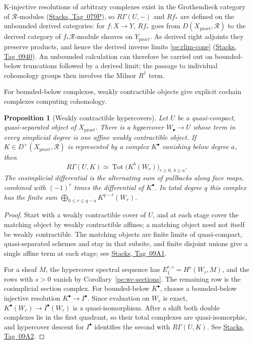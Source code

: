 \documentclass[11pt,a4paper]{article}
\numberwithin{equation}{section}
\newtheorem{proposition}[theorem]{Proposition}
\theoremstyle{definition}
\theoremstyle{remark}
\newcommand{\proet}{\mathrm{pro}\acute{e}t}
\newcommand{\stacks}[1]{\href{https://stacks.math.columbia.edu/tag/#1}{\textnormal{Stacks, Tag~#1}}}
\begin{document}
K-injective resolutions of arbitrary complexes exist in the
Grothendieck category of $\mathcal R$-modules (\stacks{079P}), so
$R\Gamma(U,-)$ and $Rf_*$ are defined on the unbounded derived
categories: for $f\colon X\to Y$, $Rf_*$ goes from
$D(X_{\proet},\mathcal R)$ to the derived category of
$f_*\mathcal R$-module sheaves on $Y_{\proet}$. As derived right adjoints they preserve products, and
hence the derived inverse limits \eqref{pe:rlim-cone} (\stacks{0940}).
An unbounded calculation can therefore be carried out on bounded-below
truncations followed by a derived limit; the passage to individual
cohomology groups then involves the Milnor $R^1$ term.

For bounded-below complexes, weakly contractible objects give explicit
cochain complexes computing cohomology.

\begin{proposition}[Weakly contractible hypercovers]
\label{pe:hypercover}
Let $U$ be a quasi-compact, quasi-separated object of $X_{\proet}$.
There is a hypercover $W_\bullet\to U$ whose term in every simplicial
degree is one affine weakly contractible object. If
$K\in D^+(X_{\proet},\mathcal R)$ is represented by a complex
$K^\bullet$ vanishing below degree $a$, then
\begin{equation}\label{pe:hypercover-complex}
 R\Gamma(U,K)
 \simeq \operatorname{Tot}\bigl(K^b(W_r)\bigr)_{r\geq0,\ b\geq a}.
\end{equation}
The cosimplicial differential is the alternating sum of pullbacks
along face maps, combined with $(-1)^r$ times the differential of
$K^\bullet$. In total degree $q$ this complex has the finite sum
$\bigoplus_{0\leq r\leq q-a}K^{q-r}(W_r)$.
\end{proposition}
\begin{proof}
Start with a weakly contractible cover of $U$, and at each stage cover
the matching object by weakly contractible affines; a matching object
need not itself be weakly contractible. The matching objects are
finite limits of quasi-compact, quasi-separated schemes and stay in
that subsite, and finite disjoint unions give a single affine term at
each stage; see \stacks{09A1}.

For a sheaf $M$, the hypercover spectral sequence has
$E_1^{r,s}=H^s(W_r,M)$, and the rows with $s>0$ vanish by
Corollary~\ref{pe:wc-sections}. The remaining row is the
cosimplicial section complex. For bounded-below $K^\bullet$, choose
a bounded-below injective resolution $K^\bullet\to I^\bullet$. Since
evaluation on $W_r$ is exact, $K^\bullet(W_r)\to I^\bullet(W_r)$ is a
quasi-isomorphism. After a shift both double complexes lie in the
first quadrant, so their total complexes are quasi-isomorphic, and
hypercover descent for $I^\bullet$ identifies the second with
$R\Gamma(U,K)$. See \stacks{09A2}.
\end{proof}
\end{document}
